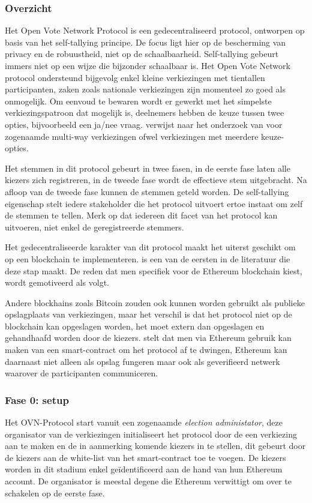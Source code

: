 		\subsubsection*{Overzicht }
			Het Open Vote Network Protocol is een gedecentraliseerd protocol, ontworpen op basis van het self-tallying principe. De focus ligt hier op de bescherming van privacy en de robuustheid, niet op de schaalbaarheid. Self-tallying gebeurt immers niet op een wijze die bijzonder schaalbaar is. Het  Open Vote Network protocol ondersteund bijgevolg enkel kleine verkiezingen met tientallen participanten, zaken zoals nationale verkiezingen zijn momenteel  zo goed als onmogelijk. Om eenvoud te bewaren wordt er gewerkt met het simpelste verkiezingspatroon dat mogelijk is, deelnemers hebben de keuze tussen twee opties, bijvoorbeeld een ja/nee vraag.  \textcite{McCorry2017} verwijst naar het onderzoek van \textcite{Hao2009} voor zogenaamde multi-way verkiezingen ofwel verkiezingen met meerdere keuze-opties. 
			
			Het stemmen in dit protocol gebeurt in twee fasen, in de eerste fase laten alle kiezers zich registreren, in de tweede fase wordt de effectieve stem uitgebracht. Na afloop van de tweede fase kunnen de stemmen geteld worden.  De self-tallying eigenschap stelt iedere stakeholder die het protocol uitvoert ertoe instaat om zelf de stemmen te tellen. Merk op dat iedereen dit facet van het protocol kan uitvoeren, niet enkel de geregistreerde stemmers.
			 
			Het gedecentraliseerde karakter van dit protocol maakt het uiterst geschikt om op een blockchain te implementeren. \textcite{McCorry2017} is een van de eersten in de literatuur die deze stap maakt. De reden dat men specifiek voor de Ethereum blockchain kiest, wordt gemotiveerd als volgt.
			
			Andere blockhains zoals Bitcoin zouden ook kunnen worden gebruikt als publieke opslagplaats van verkiezingen, maar het verschil is dat het protocol niet op de blockchain kan opgeslagen worden, het moet extern dan opgeslagen en gehandhaafd worden door de kiezers. \textcite{McCorry2017} stelt dat men via Ethereum gebruik kan maken van een smart-contract om  het protocol af te dwingen, Ethereum kan daarnaast niet alleen als opslag fungeren maar ook als geverifieerd netwerk waarover de participanten communiceren.
		\subsubsection*{Fase 0: setup }
			Het OVN-Protocol start vanuit een zogenaamde \textit{election administator}, deze organisator van de verkiezingen initialiseert het protocol door de een verkiezing aan te maken en de in aanmerking komende kiezers in te stellen, dit gebeurt door de kiezers aan de white-list van het smart-contract toe te voegen. De kiezers worden in dit stadium enkel geïdentificeerd aan de hand van hun Ethereum account. De organisator is meestal degene die  Ethereum verwittigt om over te schakelen op de eerste fase.
